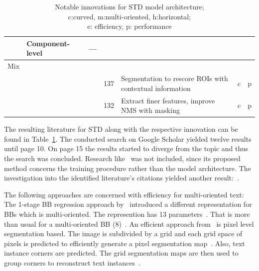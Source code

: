 \begin{table}[ht]
\begin{tabular}{p{}p{}p{}p{}
            p{}p{}p{}}
            & Component-level &~--- & & \\
        \midrule
        Mix & & \\
            & &~\cite{xie_scene_2018} & 137 & Segmentation to rescore \acp{ROI} with
                contextual information & c & p \\
            & &~\cite{dai_fused_2018} & 132 & Extract finer features, improve \ac{NMS} with masking
            & c & p \\
        \bottomrule
    \end{tabular}
    \captionsetup{justification=centering}
    \caption[Notable innovations for STD model architecture]{%
        Notable innovations for STD model architecture; \\
        c:curved, m:multi-oriented, h:horizontal; \\
        e: efficiency, p: performance\label{tb:STD-steps-properties}
    }
\end{table}
The resulting literature for \ac{STD} along with the respective innovation can be found in
Table~\ref{tb:STD-steps-properties}.
The conducted search on Google Scholar yielded twelve results until page 10.
On page 15 the results started to diverge from the topic and thus the search was concluded.
Research like~\cite{xue_accurate_2018} was not included, since its proposed method concerns the
training procedure rather than the model architecture.
The investigation into the identified literature's citations yielded another
result:~\cite{ferrari_textsnake_2018}.

The following approaches are concerned with efficiency for multi-oriented text:
The 1-stage \ac{BB} regression approach by~\citep{liao_textboxes_2018} introduced a different
representation for \acp{BB} which is multi-oriented.
The represention has 13 parameters~\citep{liao_textboxes_2018}.
That is more than usual for a multi-oriented \ac{BB} (8)~\citep{ma_arbitrary-oriented_2018}.
An efficient approach from~\cite{lyu_multi-oriented_2018} is pixel level segmentation based.
The image is subdivided by a grid and each grid space of pixels is
predicted to efficiently generate a pixel segmentation map~\citep{lyu_multi-oriented_2018}.
Also, text instance corners are predicted.
The grid segmentation maps are then used to group corners to reconstruct text
instances~\citep{lyu_multi-oriented_2018}.

